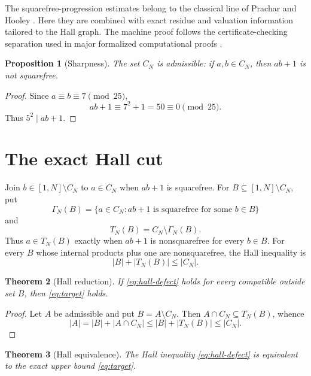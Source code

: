 \documentclass[11pt]{article}
\newtheorem{theorem}{Theorem}[section]
\newtheorem{proposition}[theorem]{Proposition}
\theoremstyle{definition}
\newcommand{\CN}{C_N}
\newcommand{\TN}{T_N}
\begin{document}
The squarefree-progression estimates belong to the classical line of
Prachar and Hooley \cite{PracharSquarefreeAP,HooleySquarefreeAP}.  Here they
are combined with exact residue and valuation information tailored to the
Hall graph.  The machine proof follows the certificate-checking separation
used in major formalized computational proofs
\cite{GonthierOddOrder,HalesFlyspeck}.

\begin{proposition}[Sharpness]\label{prop:sharpness}
The set $\CN$ is admissible: if $a,b\in\CN$, then $ab+1$ is not squarefree.
\end{proposition}

\begin{proof}
Since $a\equiv b\equiv7\pmod {25}$,
\[
  ab+1\equiv 7^2+1=50\equiv0\pmod {25}.
\]
Thus $5^2\mid ab+1$.
\end{proof}

\section{The exact Hall cut}

Join $b\in[1,N]\setminus\CN$ to $a\in\CN$ when $ab+1$ is squarefree.
For $B\subseteq[1,N]\setminus\CN$, put
\[
  \Gamma_N(B)=\{a\in\CN:\text{$ab+1$ is squarefree for some $b\in B$}\}
\]
and
\[
  \TN(B)=\CN\setminus\Gamma_N(B).
\]
Thus $a\in\TN(B)$ exactly when $ab+1$ is nonsquarefree for every $b\in B$.
For every $B$ whose internal products plus one are nonsquarefree, the Hall
inequality is
\begin{equation}\label{eq:hall-defect}
  |B|+|\TN(B)|\leq|\CN|.
\end{equation}

\begin{theorem}[Hall reduction]\label{thm:hall-reduction}
If \eqref{eq:hall-defect} holds for every compatible outside set $B$, then
\eqref{eq:target} holds.
\end{theorem}

\begin{proof}
Let $A$ be admissible and put $B=A\setminus\CN$.  Then
$A\cap\CN\subseteq\TN(B)$, whence
\[
 |A|=|B|+|A\cap\CN|
 \leq |B|+|\TN(B)|\leq|\CN|.
\]
\end{proof}

\begin{theorem}[Hall equivalence]\label{thm:hall-equivalence}
The Hall inequality \eqref{eq:hall-defect} is equivalent to the exact
upper bound \eqref{eq:target}.
\end{theorem}
\end{document}
